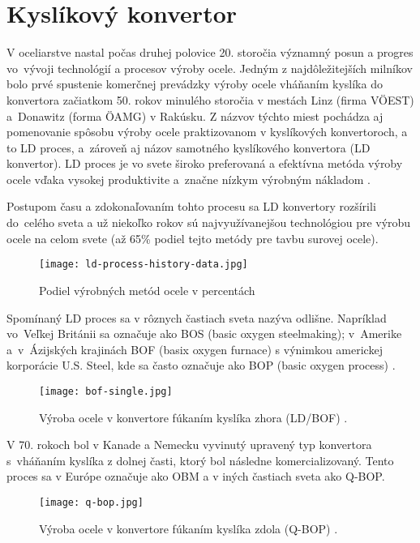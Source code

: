 \section{Kyslíkový konvertor}

V oceliarstve nastal počas druhej polovice 20. storočia významný posun a progres vo~vývoji technológií a procesov výroby ocele. Jedným z najdôležitejších milníkov bolo prvé spustenie komerčnej prevádzky výroby ocele vháňaním kyslíka do konvertora začiatkom 50. rokov minulého storočia v mestách Linz (firma VÖEST) a~Donawitz (forma ÖAMG) v Rakúsku. Z názvov týchto miest pochádza aj pomenovanie spôsobu výroby ocele praktizovanom v kyslíkových konvertoroch, a to LD proces, a~zároveň aj názov samotného kyslíkového konvertora (LD konvertor). LD proces je vo svete široko preferovaná a efektívna metóda výroby ocele vďaka vysokej produktivite a~značne nízkym výrobným nákladom \cite{Wang2010}.

Postupom času a zdokonaľovaním tohto procesu sa LD konvertory rozšírili do~celého sveta a už niekoľko rokov sú najvyužívanejšou technológiou pre výrobu ocele na celom svete (až 65\% podiel tejto metódy pre tavbu surovej ocele).

\begin{figure}[h!]
\centering
\texttt{[image: ld-process-history-data.jpg]}
\caption{Podiel výrobných metód ocele v percentách \citep{voestalpineLD2012}}
\label{o:1}
\end{figure}

Spomínaný LD proces sa v rôznych častiach sveta nazýva odlišne. Napríklad vo~Veľkej Británii sa označuje ako BOS (basic oxygen steelmaking); v~Amerike a~v~Ázijských krajinách BOF (basix oxygen furnace) s výnimkou americkej korporácie U.S. Steel, kde sa často označuje ako BOP (basic oxygen process) \citep{Turkdogan1996}.

\begin{figure}[h!]
\centering
\texttt{[image: bof-single.jpg]}
\caption{Výroba ocele v konvertore fúkaním kyslíka zhora (LD/BOF) \citep{Turkdogan1996}.}
\label{o:2}
\end{figure}

V 70. rokoch bol v Kanade a Nemecku vyvinutý upravený typ konvertora s~vháňaním kyslíka z dolnej časti, ktorý bol následne komercializovaný. Tento proces sa v Európe označuje ako OBM a v iných častiach sveta ako Q-BOP.

\begin{figure}[h!]
\centering
\texttt{[image: q-bop.jpg]}
\caption{Výroba ocele v konvertore fúkaním kyslíka zdola (Q-BOP) \citep{Turkdogan1996}.}
\label{o:3}
\end{figure}

